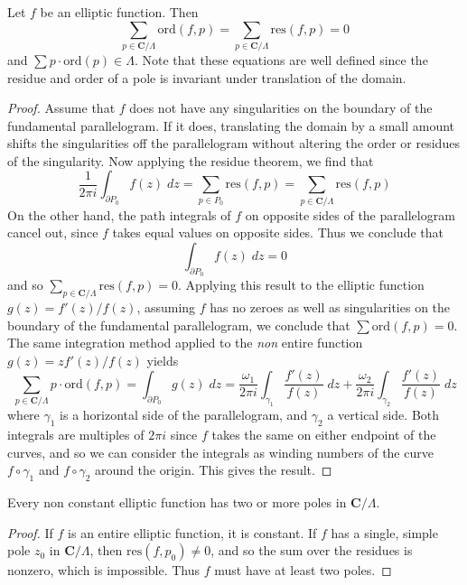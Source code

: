 \begin{theorem}
    Let $f$ be an elliptic function. Then
    \[ \sum_{p \in \mathbf{C}/\Lambda} \text{ord}(f,p) = \sum_{p \in \mathbf{C}/\Lambda} \text{res}(f,p) = 0 \]
    and $\sum p \cdot \text{ord}(p) \in \Lambda$. Note that these equations are well defined since the residue and order of a pole is invariant under translation of the domain.
\end{theorem}
\begin{proof}
    Assume that $f$ does not have any singularities on the boundary of the fundamental parallelogram. If it does, translating the domain by a small amount shifts the singularities off the parallelogram without altering the order or residues of the singularity. Now applying the residue theorem, we find that
    \[ \frac{1}{2\pi i} \int_{\partial P_0} f(z)\; dz = \sum_{p \in P_0} \text{res}(f,p) = \sum_{p \in \mathbf{C}/\Lambda} \text{res}(f,p) \]
    On the other hand, the path integrals of $f$ on opposite sides of the parallelogram cancel out, since $f$ takes equal values on opposite sides. Thus we conclude that
    \[ \int_{\partial P_0} f(z)\; dz = 0 \]
    and so $\sum_{p \in \mathbf{C}/\Lambda} \text{res}(f,p) = 0$. Applying this result to the elliptic function $g(z) = f'(z)/f(z)$, assuming $f$ has no zeroes as well as singularities on the boundary of the fundamental parallelogram, we conclude that $\sum \text{ord}(f,p) = 0$. The same integration method applied to the {\it non} entire function $g(z) = z f'(z) / f(z)$ yields
    \[ \sum_{p \in \mathbf{C}/\Lambda} p \cdot \text{ord}(f,p) = \int_{\partial P_0} g(z)\; dz = \frac{\omega_1}{2\pi i} \int_{\gamma_1} \frac{f'(z)}{f(z)}\; dz + \frac{\omega_2}{2 \pi i} \int_{\gamma_2} \frac{f'(z)}{f(z)}\; dz \]
    where $\gamma_1$ is a horizontal side of the parallelogram, and $\gamma_2$ a vertical side. Both integrals are multiples of $2 \pi i$ since $f$ takes the same on either endpoint of the curves, and so we can consider the integrals as winding numbers of the curve $f \circ \gamma_1$ and $f \circ \gamma_2$ around the origin. This gives the result.
\end{proof}

\begin{corollary}
    Every non constant elliptic function has two or more poles in $\mathbf{C}/\Lambda$.
\end{corollary}
\begin{proof}
    If $f$ is an entire elliptic function, it is constant. If $f$ has a single, simple pole $z_0$ in $\mathbf{C}/\Lambda$, then $\text{res}(f,p_0) \neq 0$, and so the sum over the residues is nonzero, which is impossible. Thus $f$ must have at least two poles.
\end{proof}

